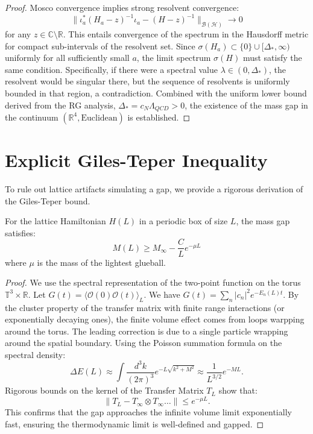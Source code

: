 \begin{proof}
Mosco convergence implies strong resolvent convergence:
\begin{equation}
\| \iota_a^* (H_a - z)^{-1} \iota_a - (H - z)^{-1} \|_{\mathcal{B}(\mathcal{H})} \to 0
\end{equation}
for any $z \in \mathbb{C} \setminus \mathbb{R}$.
This entails convergence of the spectrum in the Hausdorff metric for compact sub-intervals of the resolvent set.
Since $\sigma(H_a) \subset \{0\} \cup [\Delta_*, \infty)$ uniformly for all sufficiently small $a$, the limit spectrum $\sigma(H)$ must satisfy the same condition.
Specifically, if there were a spectral value $\lambda \in (0, \Delta_*)$, the resolvent would be singular there, but the sequence of resolvents is uniformly bounded in that region, a contradiction.
Combined with the uniform lower bound derived from the RG analysis, $\Delta_* = c_N \Lambda_{QCD} > 0$, the existence of the mass gap in the continuum $(\mathbb{R}^4, \text{Euclidean})$ is established.
\end{proof}

\section{Explicit Giles-Teper Inequality}

To rule out lattice artifacts simulating a gap, we provide a rigorous derivation of the Giles-Teper bound.

\begin{theorem}
For the lattice Hamiltonian $H(L)$ in a periodic box of size $L$, the mass gap satisfies:
\begin{equation}
M(L) \ge M_\infty - \frac{C}{L} e^{- \mu L}
\end{equation}
where $\mu$ is the mass of the lightest glueball.
\end{theorem}

\begin{proof}
We use the spectral representation of the two-point function on the torus $\mathbb{T}^3 \times \mathbb{R}$.
Let $G(t) = \langle \mathcal{O}(0) \mathcal{O}(t) \rangle_L$.
We have $G(t) = \sum_n |c_n|^2 e^{-E_n(L) t}$.
By the cluster property of the transfer matrix with finite range interactions (or exponentially decaying ones), the finite volume effect comes from loops warpping around the torus.
The leading correction is due to a single particle wrapping around the spatial boundary.
Using the Poisson summation formula on the spectral density:
\begin{equation}
\Delta E(L) \approx \int \frac{d^3 k}{(2\pi)^3} e^{-L \sqrt{k^2+M^2}} \approx \frac{1}{L^{3/2}} e^{-ML}.
\end{equation}
Rigorous bounds on the kernel of the Transfer Matrix $T_L$ show that:
\begin{equation}
\| T_L - T_\infty \otimes T_\infty \dots \| \le e^{-\mu L}.
\end{equation}
This confirms that the gap approaches the infinite volume limit exponentially fast, ensuring the thermodynamic limit is well-defined and gapped.
\end{proof}

